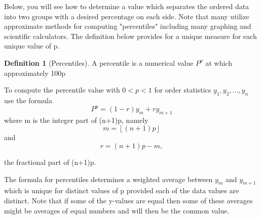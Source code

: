 \documentclass[10pt,]{book}
\theoremstyle{plain}
\theoremstyle{definition}
\newtheorem{definition}[theorem]{Definition}
\theoremstyle{definition}
\theoremstyle{definition}
\numberwithin{equation}{section}
\newcommand{\lt}{ < }
\begin{document}
	Below, you will see how to determine a value which separates the ordered data into two groups with a desired percentage on each side. Note that many utilize approximate methods for computing "percentiles" including many graphing and scientific calculators. The definition below provides for a unique measure for each unique value of p.
\begin{definition}[{Percentiles}]\label{definition-3}
A percentile is a numerical value \(P^p\) at which approximately 100p%
\par
To compute the percentile value with \(0 \lt p \lt 1\) for order statistics \(y_1, y_2, ..., y_n\) use the formula 
		\begin{equation*}P^{p} = (1-r)y_m + ry_{m+1}\end{equation*}
	where m is the integer part of (n+1)p, namely 
		\begin{equation*}m = \left\lfloor (n+1)p \right\rfloor\end{equation*} 
	and 
		\begin{equation*}r = (n+1)p - m,\end{equation*}
	
	the fractional part of (n+1)p. 
\end{definition}
\par
The formula for percentiles determines a weighted average between \(y_m\) and \(y_{m+1}\) which is unique for distinct values of p provided each of the data values are distinct. Note that if some of the y-values are equal then some of these averages might be averages of equal numbers and will then be the common value.%
\end{document}
